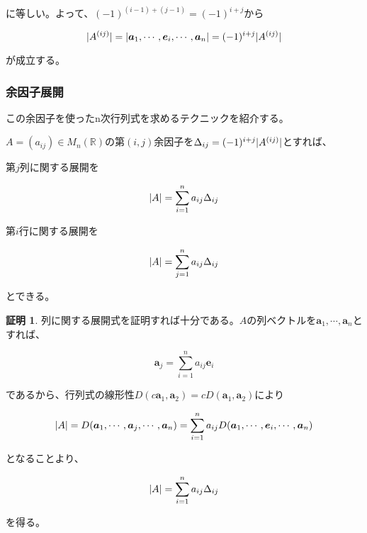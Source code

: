 \documentclass[dvipdfmx,autodetect-engine]{jsarticle}
\theoremstyle{definition}
\newtheorem*{Proof*}{証明}
\DeclarePairedDelimiter{\abs}{\lvert}{\rvert}
\begin{document}
に等しい。よって、$(-1)^{(i-1)+(j-1)} = (-1)^{i+j}$から

$$
\abs{A^{(ij)}} = \abs{\bm{a}_1, \cdots, \bm{e}_i, \cdots, \bm{a}_n} = (-1)^{i+j}\abs{A^{(ij)}}
$$

が成立する。

\subsubsection{余因子展開}

この余因子を使ったn次行列式を求めるテクニックを紹介する。

$A = (a_{ij}) \in M_n(\mathbb{R})$の第$(i,j)$余因子を$\Delta_{ij} = (-1)^{i+j}\abs{A^{(ij)}}$とすれば、

第$j$列に関する展開を

$$
\abs{A} = \sum_{i=1}^{n} a_{ij}\Delta_{ij}
$$

第$i$行に関する展開を

$$
\abs{A} = \sum_{j=1}^{n} a_{ij}\Delta_{ij}
$$

とできる。

\begin{Proof*}
列に関する展開式を証明すれば十分である。$A$の列ベクトルを$\bm{a}_1, \cdots, \bm{a}_n$とすれば、

$$
\bm{a}_j = \sum_{i=1}^{n} a_{ij}\bm{e}_i
$$

であるから、行列式の線形性$D(c\bm{a}_1, \bm{a}_2) = cD(\bm{a}_1, \bm{a}_2)$により

$$
\abs{A} = D(\bm{a}_1, \cdots, \bm{a}_j, \cdots, \bm{a}_n) = \sum_{i=1}^{n} a_{ij}D(\bm{a}_1, \cdots, \bm{e}_i, \cdots, \bm{a}_n)
$$

となることより、

$$
\abs{A} = \sum_{i=1}^{n} a_{ij}\Delta_{ij}
$$

を得る。
\end{Proof*}

\end{document}

